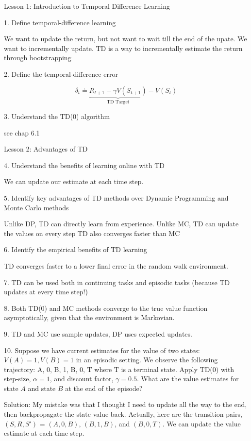 \documentclass[sutton_barto_notes.tex]{subfiles}
\begin{document}
Lesson 1: Introduction to Temporal Difference Learning

1. Define temporal-difference learning

We want to update the return, but not want to wait till the end of the upate. We want to incrementally update. TD is a way to incrementally estimate the return through bootstrapping

2. Define the temporal-difference error

$$\delta_t \doteq \underbrace{R_{t+1} + \gamma V(S_{t+1})}_\text{TD Target} - V(S_t)$$

3. Understand the TD(0) algorithm

see chap 6.1

Lesson 2: Advantages of TD

4. Understand the benefits of learning online with TD

We can update our estimate at each time step.

5. Identify key advantages of TD methods over Dynamic Programming and Monte Carlo methods

Unlike DP, TD can directly learn from experience. Unlike MC, TD can update the values on every step TD also converges faster than MC

6. Identify the empirical benefits of TD learning

TD converges faster to a lower final error in the random walk environment.

7. TD can be used both in continuing tasks and episodic tasks (because TD updates at every time step!)

8. Both TD(0) and MC methods converge to the true value function asymptotically, given that the environment is Markovian.

9. TD and MC use sample updates, DP uses expected updates.

10. Suppose we have current estimates for the value of two states: $V(A) = 1, V(B) = 1$ in an episodic setting. We observe the following trajectory: A, 0, B, 1, B, 0, T where T is a terminal state. Apply TD(0) with step-size, $\alpha = 1$, and discount factor, $\gamma = 0.5$. What are the value estimates for state $A$ and state $B$ at the end of the episode?

Solution: My mistake was that I thought I need to update all the way to the end, then backpropagate the state value back.
Actually, here are the transition pairs, $(S, R, S')$ = $(A, 0, B)$, $(B, 1, B)$, and $(B, 0, T)$. We can update the value estimate at each time step.
\end{document}
